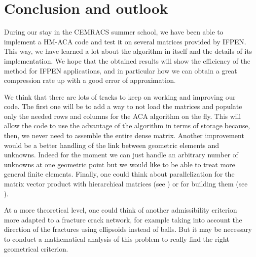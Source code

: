 

\section*{Conclusion and outlook}

During our stay in the CEMRACS summer school, we have been able to implement a HM-ACA code and test it on several matrices provided by IFPEN. This way, we have learned a lot about the algorithm in itself and the details of its implementation. We hope that the obtained results will show the efficiency of the method for IFPEN applications, and in particular how we can obtain a great compression rate up with a good error of approximation.

\bigskip

We think that there are lots of tracks to keep on working and improving our code. The first one will be to add a way to not load the matrices and populate only the needed rows and columns for the ACA algorithm on the fly. This will allow the code to use the advantage of the algorithm in terms of storage because, then, we never need to assemble the entire dense matrix. Another improvement would be a better handling of the link between geometric elements and unknowns. Indeed for the moment we can just handle an arbitrary number of unknowns at one geometric point but we would like to be able to treat more general finite elements. Finally, one could think about parallelization for the matrix vector product with hierarchical matrices (see \cite[Section 3.1]{Bebendorf2008}) or for building them (see \cite[Section 3.4.6]{Bebendorf2008}).

At a more theoretical level, one could think of another admissibility criterion more adapted to a fracture crack network, for example taking into account the direction of the fractures using ellipsoids instead of balls. But it may be necessary to conduct a mathematical analysis of this problem to really find the right geometrical criterion.